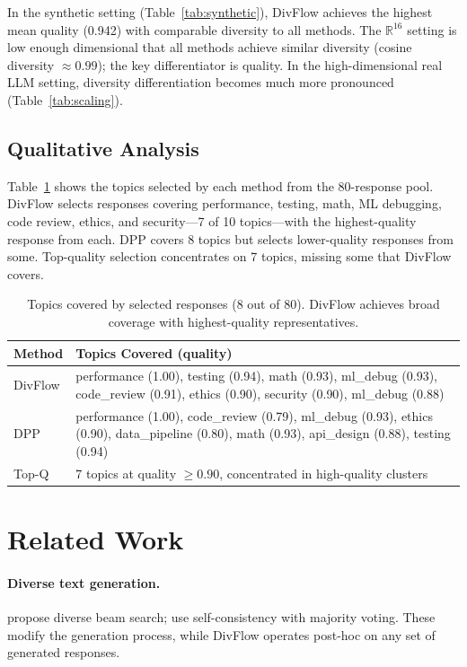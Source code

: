 \documentclass[10pt]{article}
\begin{document}
In the synthetic setting (Table~\ref{tab:synthetic}), DivFlow achieves the highest mean quality (0.942) with comparable diversity to all methods.
The $\mathbb{R}^{16}$ setting is low enough dimensional that all methods achieve similar diversity (cosine diversity $\approx 0.99$); the key differentiator is quality.
In the high-dimensional real LLM setting, diversity differentiation becomes much more pronounced (Table~\ref{tab:scaling}).

\subsection{Qualitative Analysis}

Table~\ref{tab:qualitative} shows the topics selected by each method from the 80-response pool.
DivFlow selects responses covering performance, testing, math, ML debugging, code review, ethics, and security---7 of 10 topics---with the highest-quality response from each.
DPP covers 8 topics but selects lower-quality responses from some.
Top-quality selection concentrates on 7 topics, missing some that DivFlow covers.

\begin{table}[t]
\centering
\caption{Topics covered by selected responses (8 out of 80). DivFlow achieves broad coverage with highest-quality representatives.}
\label{tab:qualitative}
\small
\begin{tabularx}{\textwidth}{lX}
\toprule
\textbf{Method} & \textbf{Topics Covered (quality)} \\
\midrule
DivFlow & performance (1.00), testing (0.94), math (0.93), ml\_debug (0.93), code\_review (0.91), ethics (0.90), security (0.90), ml\_debug (0.88) \\
DPP & performance (1.00), code\_review (0.79), ml\_debug (0.93), ethics (0.90), data\_pipeline (0.80), math (0.93), api\_design (0.88), testing (0.94) \\
Top-Q & 7 topics at quality $\geq 0.90$, concentrated in high-quality clusters \\
\bottomrule
\end{tabularx}
\end{table}

\section{Related Work}
\label{sec:related}

\paragraph{Diverse text generation.}
\citet{li2023diverse} propose diverse beam search; \citet{wang2023selfconsistency} use self-consistency with majority voting.
These modify the generation process, while DivFlow operates post-hoc on any set of generated responses.
\end{document}

